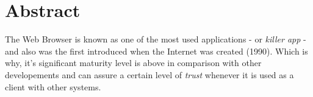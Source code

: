 \section*{Abstract}

The Web Browser is known as one of the most used applications - or \textit{killer app} - and also was the first introduced when the Internet was created (1990). Which is why, it's significant maturity level is above in comparison with other developements and can assure a certain level of \textit{trust} whenever it is used as a client with other systems.

\label{chap:abstract}



